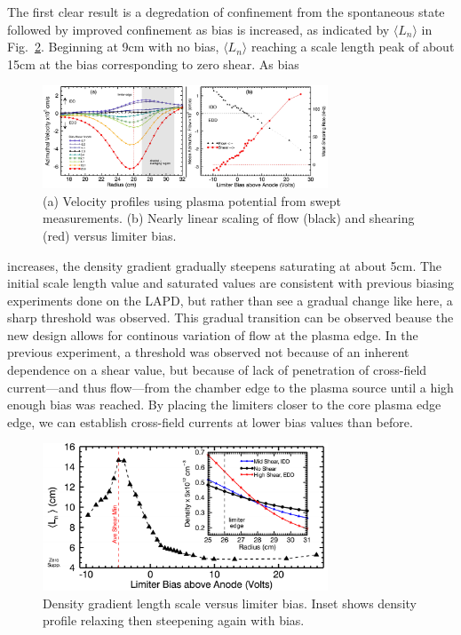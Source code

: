 \documentclass[%
 aps,
 prl,
 amsmath,amssymb,
 reprint,%
]{revtex4-1}
\begin{document}
The first clear result is a degredation of confinement from the spontaneous state followed by improved confinement as bias is increased, as indicated by $\langle L_{n}\rangle$ in Fig.~\ref{fig:densgrad}. Beginning at 9cm with no bias, $\langle L_{n}\rangle$ reaching a scale length peak of about 15cm at the bias corresponding to zero shear. As bias
\begin{figure}
\begin{center}
\includegraphics[width=8.5cm]{velocity_flowshear.pdf}%
\caption{\label{fig:velocity_flowshear} (a) Velocity profiles using plasma potential from swept measurements. (b) Nearly linear scaling of flow (black) and shearing (red) versus limiter bias.}
\end{center}
\end{figure}
increases, the density gradient gradually steepens saturating at about 5cm. The initial scale length value and saturated values are consistent with previous biasing experiments done on the LAPD\cite{carter09}, but rather than see a gradual change like here, a sharp threshold was observed. This gradual transition can be observed beause the new design allows for continous variation of flow at the plasma edge. In the previous experiment, a threshold was observed not because of an inherent dependence on a shear value, but because of lack of penetration of cross-field current---and thus flow---from the chamber edge to the plasma source until a high enough bias was reached. By placing the limiters closer to the core plasma edge edge, we can establish cross-field currents at lower bias values than before.

\begin{figure}
\begin{center}
\includegraphics[width=8.5cm]{densgrad.pdf}%
\caption{\label{fig:densgrad} Density gradient length scale versus limiter bias. Inset shows density profile relaxing then steepening again with bias.}
\end{center}
\end{figure}
\end{document}
